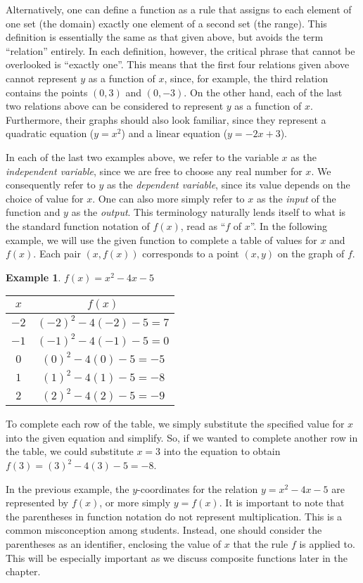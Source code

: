 \documentclass[12pt]{book}
\theoremstyle{definition}
\newtheorem{example}{Example}
\begin{document}
Alternatively, one can define a function as a rule that assigns to each element of one set (the domain) exactly one element of a second set (the range).  This definition is essentially the same as that given above, but avoids the term ``relation'' entirely.  In each definition, however, the critical phrase that cannot be overlooked is ``exactly one''.  This means that the first four relations given above cannot represent $y$ as a function of $x$, since, for example, the third relation contains the points $(0,3)$ and $(0,-3)$.  On the other hand, each of the last two relations above can be considered to represent $y$ as a function of $x$.  Furthermore, their graphs should also look familiar, since they represent a quadratic equation ($y=x^2$) and a linear equation ($y=-2x+3$).\par
In each of the last two examples above, we refer to the variable $x$ as the {\it independent variable}, since we are free to choose any real number for $x$.  We consequently refer to $y$ as the {\it dependent variable}, since its value depends on the choice of value for $x$.  One can also more simply refer to $x$ as the {\it input} of the function and $y$ as the {\it output}.  This terminology naturally lends itself to what is the standard function notation of $f(x)$, read as ``$f$ of $x$''.  In the following example, we will use the given function to complete a table of values for $x$ and $f(x)$.  Each pair $(x,f(x))$ corresponds to a point $(x,y)$ on the graph of $f$.\par
\begin{example} $f(x)=x^2-4x-5$
\begin{center}
\begin{tabular}{c|c}
	$x$ & $f(x)$\\
	\hline
	$-2$ & $(-2)^2-4(-2)-5=7$\\
	\hline
	$-1$ & $(-1)^2-4(-1)-5=0$\\
	\hline
	$0$ & $(0)^2-4(0)-5=-5$\\
	\hline
	$1$ & $(1)^2-4(1)-5=-8$\\
	\hline
	$2$ & $(2)^2-4(2)-5=-9$
\end{tabular}
\end{center}
\end{example}
To complete each row of the table, we simply substitute the specified value for $x$ into the given equation and simplify.  So, if we wanted to complete another row in the table, we could substitute $x=3$ into the equation to obtain $f(3)=(3)^2-4(3)-5=-8$.\par
In the previous example, the $y$-coordinates for the relation $y=x^2-4x-5$ are represented by $f(x)$, or more simply $y=f(x)$.  It is important to note that the parentheses in function notation do not represent multiplication.  This is a common misconception among students.  Instead, one should consider the parentheses as an identifier, enclosing the value of $x$ that the rule $f$ is applied to.  This will be especially important as we discuss composite functions later in the chapter.\par
\end{document}
